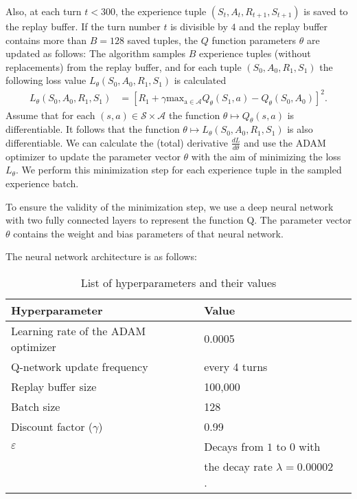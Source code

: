 \documentclass[a4paper,11pt]{amsart}
\begin{document}
Also, at each turn $t<300$, the experience tuple $\left( S_{t}, A_{t}, R_{t+1}, S_{t+1}
\right)$ is saved to the replay buffer. If the turn number $t$ is divisible by
$4$ and the replay buffer contains more than $B=128$ saved tuples, the $Q$
function parameters $\theta$ are updated as follows: The algorithm
samples $B$ experience tuples (without replacements) from the replay buffer, and
for each tuple $(S_0, A_0, R_1, S_1)$ the following loss value 
$L_\theta(S_0, A_0, R_1, S_1)$ is calculated
\begin{align*}
L_\theta(S_0, A_0, R_1, S_1) &= \left[ 
        R_1 + \gamma \operatorname{max_{a\in\mathcal A}} Q_{\theta}(S_1, a) - 
        Q_{\theta}(S_0, A_0)
    \right]^2.
\end{align*}
Assume that for each $(s, a) \in \mathcal S \times \mathcal A$ the function
$\theta \mapsto Q_{\theta}(s,a)$ is differentiable. It follows that the
function $\theta\mapsto L_\theta(S_0, A_0, R_1, S_1)$ is also differentiable.
We can calculate the (total) derivative $\frac{d L}{d\theta}$ and use the ADAM
optimizer to update the parameter vector $\theta$ with the aim of minimizing
the loss $L_{\theta}$. We perform this minimization step for each experience
tuple in the sampled experience batch.

To ensure the validity of the minimization step, we use a deep neural network
with two fully connected layers to represent the function Q. The parameter
vector $\theta$ contains the weight and bias parameters of that neural network.

The neural network architecture is as follows: 



\begin{table}
\caption{List of hyperparameters and their values}
\begin{tabular}{|l|l|l|}
    \hline
Hyperparameter & Value \\ 
    \hline \hline
    Learning rate of the ADAM optimizer & 0.0005 \\
    Q-network update frequency & every 4 turns \\
    Replay buffer size & 100,000 \\
    Batch size & 128  \\
    Discount factor ($\gamma$) & 0.99 \\
    $\varepsilon$ & Decays from $1$ to $0$ with \\
    & the decay rate $\lambda = 0.00002$. \\
    \hline
\end{tabular}
\label{tab:hyperparameters}
\end{table}
\end{document}
